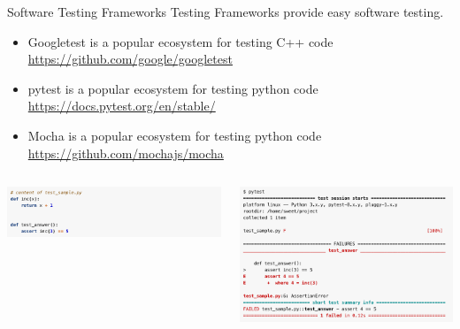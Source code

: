 \documentclass{setbeamer}
\begin{document}
\begin{frame}{Software Testing Frameworks}
\vspace{.3cm}
Testing Frameworks provide easy software testing.
\begin{itemize}
\item Googletest is a popular ecosystem for testing C++ code \url{https://github.com/google/googletest}
\item pytest is a popular ecosystem for testing python code \url{https://docs.pytest.org/en/stable/}
\item Mocha is a popular ecosystem for testing python code \url{https://github.com/mochajs/mocha}
\end{itemize}
\begin{columns}
\begin{column}{0.5\textwidth}
\includegraphics[width=7cm]{resources/pytest1.png}
\end{column}
\begin{column}{0.5\textwidth}
\vspace{1cm}
\includegraphics[width=7cm]{resources/pytest2.png} 
\end{column}
\end{columns}
  
      
\end{frame}
\end{document}
